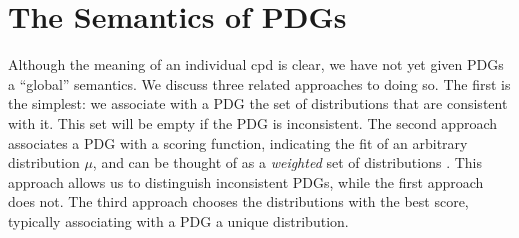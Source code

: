


\section{The Semantics of PDGs}
	\label{sec:semantics}
Although the meaning of an individual cpd is clear, we have not yet given 
PDGs a ``global'' semantics. We discuss three related approaches to doing so.
The first is the simplest: we associate with a PDG the set of distributions that
are consistent with it. This set will be empty if the PDG is inconsistent.
The second approach associates a PDG with a scoring function, indicating the fit
of an arbitrary distribution $\mu$, and can be thought of as a \emph{weighted}
set of distributions \citep{HL12}. This approach allows us to distinguish
inconsistent PDGs, while the first approach does not. The third approach chooses
the distributions with the best score, typically associating with a PDG a unique
distribution.

